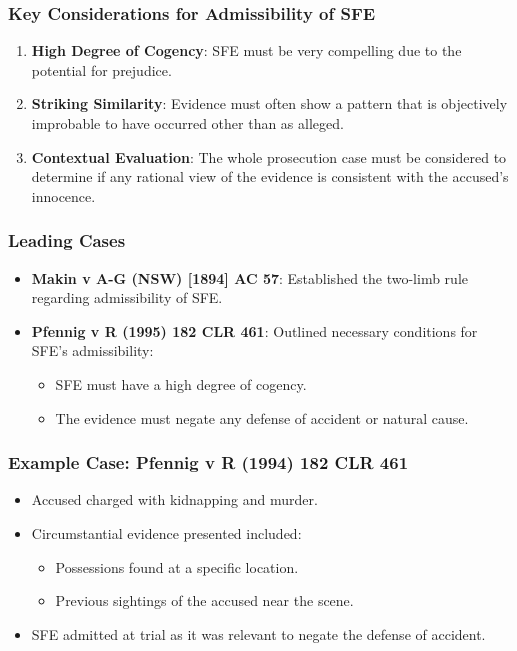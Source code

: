 \subsubsection{Key Considerations for Admissibility of
SFE}\label{key-considerations-for-admissibility-of-sfe}

\begin{enumerate}
\def\labelenumi{\arabic{enumi}.}
\tightlist
\item
  \textbf{High Degree of Cogency}: SFE must be very compelling due to
  the potential for prejudice.
\item
  \textbf{Striking Similarity}: Evidence must often show a pattern that
  is objectively improbable to have occurred other than as alleged.
\item
  \textbf{Contextual Evaluation}: The whole prosecution case must be
  considered to determine if any rational view of the evidence is
  consistent with the accused's innocence.
\end{enumerate}

\subsubsection{Leading Cases}\label{leading-cases-1}

\begin{itemize}
\tightlist
\item
  \textbf{Makin v A-G (NSW) {[}1894{]} AC 57}: Established the two-limb
  rule regarding admissibility of SFE.
\item
  \textbf{Pfennig v R (1995) 182 CLR 461}: Outlined necessary conditions
  for SFE's admissibility:

  \begin{itemize}
  \tightlist
  \item
    SFE must have a high degree of cogency.
  \item
    The evidence must negate any defense of accident or natural cause.
  \end{itemize}
\end{itemize}

\subsubsection{\texorpdfstring{Example Case: \textbf{Pfennig v R (1994)
182 CLR
461}}{Example Case: Pfennig v R (1994) 182 CLR 461}}\label{example-case-pfennig-v-r-1994-182-clr-461}

\begin{itemize}
\tightlist
\item
  Accused charged with kidnapping and murder.
\item
  Circumstantial evidence presented included:

  \begin{itemize}
  \tightlist
  \item
    Possessions found at a specific location.
  \item
    Previous sightings of the accused near the scene.
  \end{itemize}
\item
  SFE admitted at trial as it was relevant to negate the defense of
  accident.
\end{itemize}

